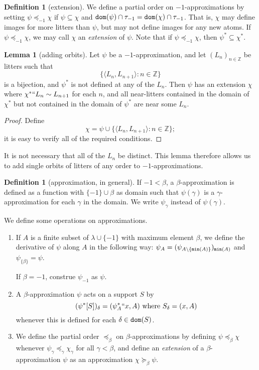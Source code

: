\documentclass[112pt]{article}
\theoremstyle{definition}
\newtheorem{lemma}[theorem]{Lemma}
\newtheorem{definition}[theorem]{Definition}
\theoremstyle{remark}
\begin{document}
\begin{definition}[extension]
  We define a partial order on $-1$-approximations by setting $\psi \preceq_{-1} \chi$ if $\psi \subseteq \chi$ and ${\tt dom}(\psi) \cap \tau_{-1} = {\tt dom}(\chi) \cap \tau_{-1}$.
  That is, $\chi$ may define images for more litters than $\psi$, but may not define images for any new atoms.
  If $\psi \preceq_{-1} \chi$, we may call $\chi$ an {\em extension\/} of $\psi$.
  Note that if $\psi \preceq_{-1} \chi$, then $\psi^* \subseteq \chi^*$.
\end{definition}
\begin{lemma}[adding orbits]\label{lem:add_orbits}
  Let $\psi$ be a $-1$-approximation, and let $(L_n)_{n \in \mathbb Z}$ be litters such that $$\{ \langle L_n, L_{n+1} \rangle : n \in \mathbb Z \}$$ is a bijection, and $\psi^*$ is not defined at any of the $L_n$.
  Then $\psi$ has an extension $\chi$ where $\chi^* `` L_n \sim L_{n+1}$ for each $n$, and all near-litters contained  in the domain of  $\chi^*$ but not contained in the domain of $\psi^*$ are near some $L_n$.
\end{lemma}
\begin{proof}
  Define
  $$ \chi = \psi \cup \{ \langle L_n, L_{n+1} \rangle : n \in \mathbb Z \}; $$
  it is easy to verify all of the required conditions.
\end{proof}
It is not necessary that all of the $L_n$ be distinct.
This lemma therefore allows us to add single orbits of litters of any order to $-1$-approximations.
\begin{definition}[approximation, in general]\label{def:approx}
  If $-1 < \beta$, a $\beta$-approximation is defined as a function with $\{-1\} \cup \beta$ as domain such that $\psi(\gamma)$ is a $\gamma$-approximation for each $\gamma$ in the domain.  We write $\psi_\gamma$ instead of $\psi(\gamma)$.

  We define some operations on approximations.
  \begin{enumerate}
    \item If $A$ is a finite subset of $\lambda\cup \{-1\}$ with maximum element $\beta$, we define the derivative of $\psi$ along $A$ in the following way: $\psi_A = (\psi_{A \setminus \{{\tt min}(A)\}})_{{\tt min}(A)}$ and 
$\psi_{\{\beta\}} = \psi$.
   
  If $\beta=-1$, construe $\psi_{-1}$ as $\psi$.

    \item A $\beta$-approximation $\psi$ acts on a support $S$ by
    $$ (\psi^*[S])_\delta = (\psi_A ^*`` x, A) \ \mathrm{where}\ S_\delta = (x, A) $$
    whenever this is defined for each $\delta \in {\tt dom}(S)$.
    \item We define the partial order $\preceq_\beta$ on $\beta$-approximations by defining $\psi \preceq_\beta \chi$ whenever $\psi_\gamma \preceq_\gamma \chi_\gamma$ for all $\gamma < \beta$, and define an {\em extension\/} of a $\beta$-approximation $\psi$ as an approximation $\chi \succeq_\beta \psi$.

  \end{enumerate}
\end{definition}
\end{document}
